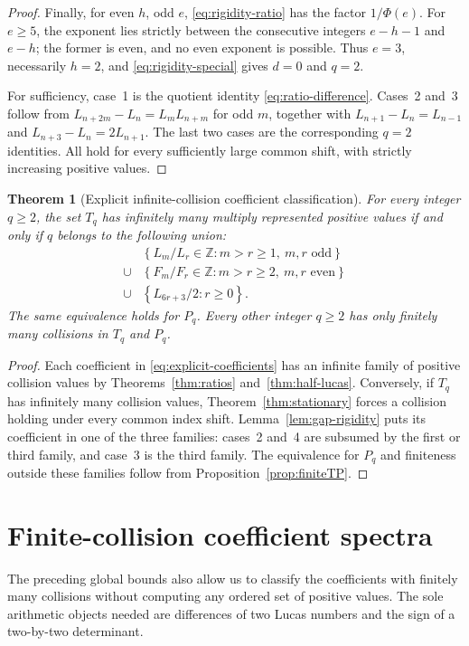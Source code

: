 \documentclass[11pt]{article}
\newtheorem{theorem}{Theorem}[section]
\begin{document}
\begin{proof}
Finally, for even \(h\), odd \(e\),
\eqref{eq:rigidity-ratio} has the factor \(1/\Phi(e)\).
For \(e\ge5\), the exponent lies strictly between
the consecutive integers \(e-h-1\) and \(e-h\);
the former is even, and no even exponent is possible.
Thus \(e=3\), necessarily \(h=2\), and
\eqref{eq:rigidity-special} gives \(d=0\) and \(q=2\).

For sufficiency, case~1 is the quotient identity
\eqref{eq:ratio-difference}. Cases~2 and~3 follow
from \(L_{n+2m}-L_n=L_mL_{n+m}\) for odd \(m\),
together with
\(L_{n+1}-L_n=L_{n-1}\) and
\(L_{n+3}-L_n=2L_{n+1}\).
The last two cases are the corresponding \(q=2\)
identities. All hold for every sufficiently large
common shift, with strictly increasing positive values.
\end{proof}

\begin{theorem}[Explicit infinite-collision coefficient classification]
\label{thm:explicit-infinite}
For every integer \(q\ge2\), the set \(T_q\) has
infinitely many multiply represented positive values
if and only if \(q\) belongs to the following union:
\begin{equation}\label{eq:explicit-coefficients}
\boxed{\begin{aligned}
&\left\{L_m/L_r\in\mathbb Z:
  m>r\ge1,\ m,r\text{ odd}\right\}\\
{}\cup{}&
\left\{F_m/F_r\in\mathbb Z:
  m>r\ge2,\ m,r\text{ even}\right\}\\
{}\cup{}&
\left\{L_{6r+3}/2:r\ge0\right\}.
\end{aligned}}
\end{equation}
The same equivalence holds for \(P_q\).
Every other integer \(q\ge2\) has only finitely many
collisions in \(T_q\) and \(P_q\).
\end{theorem}
\begin{proof}
Each coefficient in \eqref{eq:explicit-coefficients}
has an infinite family of positive collision values
by Theorems~\ref{thm:ratios} and~\ref{thm:half-lucas}.
Conversely, if \(T_q\) has infinitely many collision
values, Theorem~\ref{thm:stationary} forces a collision
holding under every common index shift.
Lemma~\ref{lem:gap-rigidity} puts its coefficient
in one of the three families: cases~2 and~4
are subsumed by the first or third family, and
case~3 is the third family.
The equivalence for \(P_q\) and finiteness outside
these families follow from
Proposition~\ref{prop:finiteTP}.
\end{proof}

\section{Finite-collision coefficient spectra}
The preceding global bounds also allow us to classify the
coefficients with finitely many collisions without computing any ordered
set of positive values. The sole arithmetic objects needed
are differences of two Lucas numbers and the sign of a
two-by-two determinant.
\end{document}
